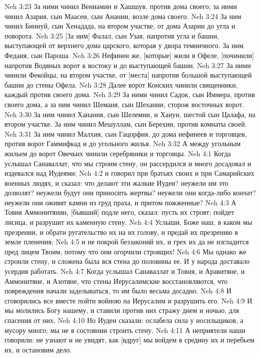 Neh 3:23  За ними чинил Вениамин и Хашшув, против дома своего; за ними чинил Азария, сын Маасеи, сын Анании, возле дома своего.
Neh 3:24  За ним чинил Биннуй, сын Хенадада, на втором участке, от дома Азарии до угла и поворота.
Neh 3:25  [За ним] Фалал, сын Узая, напротив угла и башни, выступающей от верхнего дома царского, которая у двора темничного. За ним Федаия, сын Пароша.
Neh 3:26  Нефинеи же, [которые] жили в Офеле, [починили] напротив Водяных ворот к востоку и до выступающей башни.
Neh 3:27  За ними чинили Фекойцы, на втором участке, от [места] напротив большой выступающей башни до стены Офела.
Neh 3:28  Далее ворот Конских чинили священники, каждый против своего дома.
Neh 3:29  За ними чинил Садок, сын Иммера, против своего дома, а за ним чинил Шемаия, сын Шехании, сторож восточных ворот.
Neh 3:30  За ним чинил Ханания, сын Шелемии, и Ханун, шестой сын Цалафа, на втором участке. За ним чинил Мешуллам, сын Берехии, против комнаты своей.
Neh 3:31  За ним чинил Малхия, сын Гацорфия, до дома нефинеев и торговцев, против ворот Гаммифкад и до угольного жилья.
Neh 3:32  А между угольным жильем до ворот Овечьих чинили серебряники и торговцы.
Neh 4:1  Когда услышал Санаваллат, что мы строим стену, он рассердился и много досадовал и издевался над Иудеями;
Neh 4:2  и говорил при братьях своих и при Самарийских военных людях, и сказал: что делают эти жалкие Иудеи? неужели им это дозволят? неужели будут они приносить жертвы? неужели они когда-либо кончат? неужели они оживят камни из груд праха, и притом пожженные?
Neh 4:3  А Товия Аммонитянин, [бывший] подле него, сказал: пусть их строят; пойдет лисица, и разрушит их каменную стену.
Neh 4:4  Услыши, Боже наш, в каком мы презрении, и обрати ругательство их на их голову, и предай их презрению в земле пленения;
Neh 4:5  и не покрой беззаконий их, и грех их да не изгладится пред лицем Твоим, потому что они огорчили строящих!
Neh 4:6  Мы однако же строили стену, и сложена была вся стена до половины ее. И у народа доставало усердия работать.
Neh 4:7  Когда услышал Санаваллат и Товия, и Аравитяне, и Аммонитяне, и Азотяне, что стены Иерусалимские восстановляются, что повреждения начали заделываться, то им было весьма досадно.
Neh 4:8  И сговорились все вместе пойти войною на Иерусалим и разрушить его.
Neh 4:9  И мы молились Богу нашему, и ставили против них стражу днем и ночью, для спасения от них.
Neh 4:10  Но Иудеи сказали: ослабела сила у носильщиков, а мусору много; мы не в состоянии строить стену.
Neh 4:11  А неприятели наши говорили: не узнают и не увидят, как [вдруг] мы войдем в средину их и перебьем их, и остановим дело.
